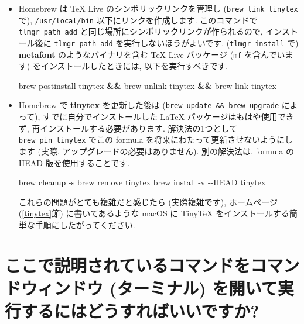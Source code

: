 \documentclass[
  xelatex,ja=standard,jafont=noto]{bxjsreport}
\newenvironment{Shaded}{\begin{snugshade}}{\end{snugshade}}
\newcommand{\AttributeTok}[1]{\textcolor[rgb]{0.77,0.63,0.00}{#1}}
\newcommand{\ExtensionTok}[1]{#1}
\newcommand{\KeywordTok}[1]{\textcolor[rgb]{0.13,0.29,0.53}{\textbf{#1}}}
\newcommand{\NormalTok}[1]{#1}
\begin{document}
\begin{itemize}
\item
  Homebrew は TeX Live のシンボリックリンクを管理し
  (\texttt{brew\ link\ tinytex} で), \texttt{/usr/local/bin}
  以下にリンクを作成します. このコマンドで \texttt{tlmgr\ path\ add}
  と同じ場所にシンボリックリンクが作られるので, インストール後に
  \texttt{tlmgr\ path\ add} を実行しないほうがよいです.
  (\texttt{tlmgr\ install} で) \textbf{metafont} のようなバイナリを含む
  TeX Live パッケージ (\texttt{mf} を含んでいます)
  をインストールしたときには, 以下を実行すべきです.

\begin{Shaded}
\begin{Highlighting}[]
\ExtensionTok{brew}\NormalTok{ postinstall tinytex }\KeywordTok{\&\&} \ExtensionTok{brew}\NormalTok{ unlink tinytex }\KeywordTok{\&\&} \ExtensionTok{brew}\NormalTok{ link tinytex}
\end{Highlighting}
\end{Shaded}
\item
  Homebrew で \textbf{tinytex} を更新した後は
  (\texttt{brew\ update\ \&\&\ brew\ upgrade} によって),
  すでに自分でインストールした LaTeX パッケージはもはや使用できず,
  再インストールする必要があります. 解決法の1つとして
  \texttt{brew\ pin\ tinytex} でこの formula
  を将来にわたって更新させないようにします (実際,
  アップグレードの必要はありません). 別の解決法は, formula の HEAD
  版を使用することです.

\begin{Shaded}
\begin{Highlighting}[]
\ExtensionTok{brew}\NormalTok{ cleanup }\AttributeTok{{-}s}
\ExtensionTok{brew}\NormalTok{ remove tinytex}
\ExtensionTok{brew}\NormalTok{ install }\AttributeTok{{-}v} \AttributeTok{{-}{-}HEAD}\NormalTok{ tinytex}
\end{Highlighting}
\end{Shaded}

  これらの問題がとても複雑だと感じたら (実際複雑です), ホームページ
  (\ref{tinytex}節) に書いてあるような macOS に TinyTeX
  をインストールする簡単な手順にしたがってください.
\end{itemize}

\hypertarget{ux3053ux3053ux3067ux8aacux660eux3055ux308cux3066ux3044ux308bux30b3ux30deux30f3ux30c9ux3092ux30b3ux30deux30f3ux30c9ux30a6ux30a3ux30f3ux30c9ux30a6-ux30bfux30fcux30dfux30caux30eb-ux3092ux958bux3044ux3066ux5b9fux884cux3059ux308bux306bux306fux3069ux3046ux3059ux308cux3070ux3044ux3044ux3067ux3059ux304b}{%
\section{ここで説明されているコマンドをコマンドウィンドウ (ターミナル)
を開いて実行するにはどうすればいいですか?}\label{ux3053ux3053ux3067ux8aacux660eux3055ux308cux3066ux3044ux308bux30b3ux30deux30f3ux30c9ux3092ux30b3ux30deux30f3ux30c9ux30a6ux30a3ux30f3ux30c9ux30a6-ux30bfux30fcux30dfux30caux30eb-ux3092ux958bux3044ux3066ux5b9fux884cux3059ux308bux306bux306fux3069ux3046ux3059ux308cux3070ux3044ux3044ux3067ux3059ux304b}}
\end{document}
